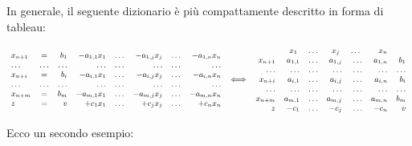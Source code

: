 \documentclass[10pt]{article}
\begin{document}
In generale, il seguente dizionario \`e 
pi\`u compattamente descritto in forma di tableau:


\[ {\small
   \begin{array}{lcrrrrrr}
      x_{n+1} &=& b_1 & -a_{1,1}x_1 & \ldots & -a_{1,j}x_j & \ldots & -a_{1,n} x_n \\
      \ldots  &\ldots& \ldots  & \ldots & \ldots  & \ldots & \ldots  & \ldots \\
      x_{n+i} &=& b_i & -a_{i,1}x_1 & \ldots & -a_{i,j}x_j & \ldots & -a_{i,n} x_n \\
      \ldots  &\ldots& \ldots  & \ldots & \ldots  & \ldots & \ldots  & \ldots \\
      x_{n+m} &=& b_m & -a_{m,1}x_1 & \ldots & -a_{m,j}x_j & \ldots & -a_{m,n} x_n \\
         z    &=& v & +c_1 x_1 & \ldots & +c_j x_j & \ldots &  +c_n x_n \\
   \end{array}
\hspace{0.2cm}
{\Huge \Longleftrightarrow}
\hspace{0.2cm}
   \begin{array}{rrrrrrr}
         & x_1 \; & \ldots  & x_j \; & \ldots  \; & x_n\\
      x_{n+1} & a_{1,1} & \ldots & a_{1,j} & \ldots & a_{1,n} &  b_1 \\
      \ldots  & \ldots  & \ldots & \ldots  & \ldots & \ldots  & \ldots \\
      x_{n+i} & a_{i,1} & \ldots & a_{i,j} & \ldots & a_{i,n} &  b_i \\
      \ldots  & \ldots  & \ldots & \ldots  & \ldots & \ldots  & \ldots \\
      x_{n+m} & a_{m,1} & \ldots & a_{m,j} & \ldots & a_{m,n} &  b_m \\
         z    & -c_1 & \ldots & -c_j & \ldots & -c_n &  v \\
   \end{array}
  }
\]



Ecco un secondo esempio:
\end{document}
